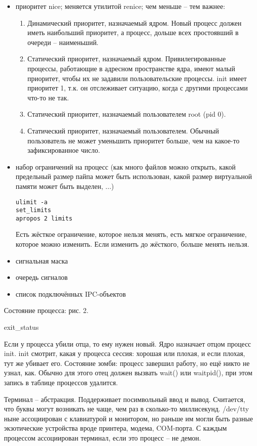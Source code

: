 \documentclass[a4paper,10pt]{article}
\begin{document}
\begin{enumerate}
\begin{enumerate}
\begin{itemize}
\item приоритет nice; меняется утилитой renice; чем меньше -- тем важнее: 
\begin{enumerate}
 \item Динамический приоритет, назначаемый ядром. Новый процесс должен иметь наибольший приоритет, а процесс, дольше всех простоявший в очереди -- наименьший.
 \item Статический приоритет, назначаемый ядром. Привилегированные процессы, работающие в адресном пространстве ядра, имеют малый приоритет, чтобы их не задавили пользовательские процессы. init имеет приоритет 1, т.к. он отслеживает ситуацию, когда с другими процессами что-то не так.
 \item Статический приоритет, назначаемый пользователем root (pid 0).
 \item Статический приоритет, назначаемый пользователем. Обычный пользователь не может уменьшить приоритет больше, чем на какое-то зафиксированное число.
\end{enumerate}
\item набор ограничений на процесс (как много файлов можно открыть, какой предельный размер пайпа может быть использован, какой размер виртуальной памяти может быть выделен, ...)

\begin{verbatim}
ulimit -a 
set_limits
apropos 2 limits
\end{verbatim}

Есть жёсткое ограничение, которое нельзя менять, есть мягкое ограничение, которое можно изменить. Если изменить до жёсткого, больше менять нельзя.

\item сигнальная маска
\item очередь сигналов
\item список подключённых IPC-объектов
\end{itemize}
\end{enumerate}
\end{enumerate}
Состояние процесса: рис. 2.

exit\_status

Если у процесса убили отца, то ему нужен новый. Ядро назначает отцом процесс init. init смотрит, какая у процесса сессия: хорошая или плохая, и если плохая, тут же убивает его.
Состояние зомби: процесс завершил работу, но ещё никто не узнал, как. Обычно для этого отец должен вызвать wait() или waitpid(), при этом запись в таблице процессов удалится.

Терминал -- абстракция. Поддерживает посимвольный ввод и вывод. Считается, что буквы могут возникать не чаще, чем раз в сколько-то миллисекунд. /dev/tty ныне ассоциирован с клавиатурой и монитором, но раньше им могли быть разные экзотические устройства вроде принтера, модема, COM-порта. С каждым процессом ассоциирован терминал, если это процесс -- не демон.
\end{document}

